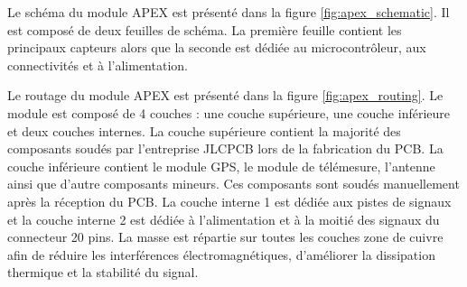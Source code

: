 \documentclass{article}
\begin{document}
Le schéma du module APEX est présenté dans la figure \ref{fig:apex_schematic}. Il est composé de
deux feuilles de schéma. La première feuille contient les principaux capteurs alors que la seconde
est dédiée au microcontrôleur, aux connectivités et à l'alimentation.

\newpage

Le routage du module APEX est présenté dans la figure \ref{fig:apex_routing}. Le module est
composé de 4 couches : une couche supérieure, une couche inférieure et deux couches
internes. La couche supérieure contient la majorité des composants soudés par l'entreprise
JLCPCB lors de la fabrication du PCB. La couche inférieure contient le module GPS, le module
de télémesure, l'antenne ainsi que d'autre composants mineurs. Ces composants sont soudés
manuellement après la réception du PCB. La couche interne 1 est dédiée aux pistes de
signaux et la couche interne 2 est dédiée à l'alimentation et à la moitié des signaux du
connecteur 20 pins. La masse est répartie sur toutes les couches zone de cuivre afin de
réduire les interférences électromagnétiques, d'améliorer la dissipation thermique et la
stabilité du signal.
\end{document}
